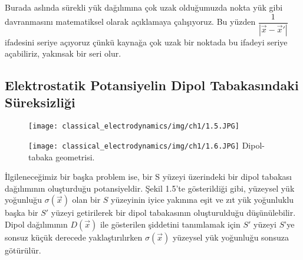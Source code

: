 \begin{theorem}
\begin{note}
    Burada aslında sürekli yük dağılımına çok uzak olduğumuzda nokta yük gibi davranmasını matematiksel olarak açıklamaya çalışıyoruz. Bu yüzden $\dfrac{1}{|\Vec{x} - \Vec{x}'|}$ ifadesini seriye açıyoruz çünkü kaynağa çok uzak bir noktada bu ifadeyi seriye açabiliriz, yakınsak bir seri olur.
\end{note}
\end{theorem}

\subsection{Elektrostatik Potansiyelin Dipol Tabakasındaki Süreksizliği}
\begin{figure}[h!]
    \centering
    \begin{minipage}{0.45\textwidth}
        \centering
        \texttt{[image: classical\_electrodynamics/img/ch1/1.5.JPG]} %
         \caption{}
    \end{minipage}
    \begin{minipage}{0.45\textwidth}
        \centering
        \texttt{[image: classical\_electrodynamics/img/ch1/1.6.JPG]} %
       {Dipol-tabaka geometrisi.}
    \end{minipage}
\end{figure}
İlgileneceğimiz bir başka problem ise, bir S yüzeyi üzerindeki bir dipol tabakası dağılımının oluşturduğu potansiyeldir. Şekil 1.5'te gösterildiği gibi, yüzeysel yük yoğunluğu $\sigma(\Vec{x})$ olan bir $S$ yüzeyinin iyice yakınına eşit ve zıt yük yoğunluklu başka bir $S'$ yüzeyi getirilerek bir dipol tabakasının oluşturulduğu düşünülebilir. Dipol dağılımının $D(\Vec{x})$ ile gösterilen şiddetini tanımlamak için  $S'$ yüzeyi  $S$'ye sonsuz küçük derecede yaklaştırılırken  $\sigma(\Vec{x})$ yüzeysel yük yoğunluğu sonsuza götürülür.
